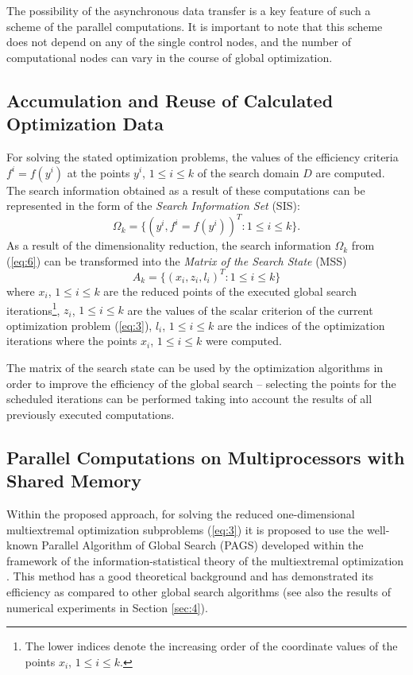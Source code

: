 The possibility of the asynchronous data transfer is a key feature of such a scheme of the parallel computations. It is important to note that this scheme does not depend on any of the single control nodes, and the number of computational nodes can vary in the course of global optimization.


\subsection{Accumulation and Reuse of Calculated Optimization Data}
\label{ssec:32}

For solving the stated optimization problems, the values of the efficiency criteria $f^i=f(y^i)$ at the points $y^i$, $1 \leq i \leq k$ of the search domain $D$ are computed. The search information obtained as a result of these computations can be represented in the form of the \textit{Search Information Set} (SIS):
\begin{equation}\label{eq:6}
\Omega_k=\{(y^i,f^i=f(y^i ) )^T:1 \leq i \leq k\}.
\end{equation}
As a result of the dimensionality reduction, the search information $\Omega_k$ from (\ref{eq:6}) can be transformed into the \textit{Matrix of the Search State} (MSS) 
\begin{equation}\label{eq:7}
A_k=\{(x_i,z_i,l_i )^T:1 \leq i \leq k\}
\end{equation}
where $x_i$, $1 \leq i \leq k$ are the reduced points of the executed global search  iterations\footnote{The lower indices denote the increasing order of the coordinate values of the points $x_i$, $1 \leq i \leq k$.}, $z_i$, $1 \leq i \leq k$ are the values of the scalar criterion of the current optimization problem (\ref{eq:3}), $l_i$, $1 \leq i \leq k$ are the indices of the optimization iterations where the points $x_i$, $1 \leq i \leq k$ were computed.

The matrix of the search state can be used by the optimization algorithms in order to improve the efficiency of the global search -- selecting the points for the scheduled iterations can be performed taking into account the results of all previously executed computations. 



\subsection{Parallel Computations on Multiprocessors with Shared Memory }
\label{ssec:33}

Within the proposed approach, for solving the reduced one-dimensional multiextremal optimization subproblems (\ref{eq:3}) it is proposed to use the well-known Parallel Algorithm of Global Search (PAGS) developed within the framework of the information-statistical theory of the multiextremal optimization \cite{c7}. This method has a good theoretical background and has demonstrated its efficiency as compared to other global search algorithms (see also the results of numerical experiments in Section \ref{sec:4}).

